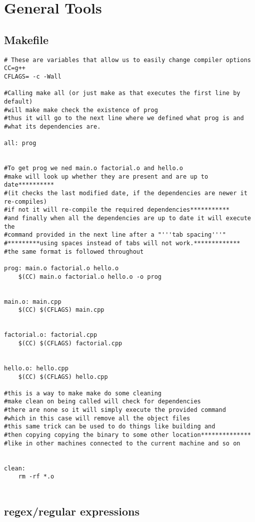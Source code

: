 \chapter{General Tools}
\section{Makefile}



\begin{lstlisting}
# These are variables that allow us to easily change compiler options
CC=g++
CFLAGS= -c -Wall

#Calling make all (or just make as that executes the first line by default) 
#will make make check the existence of prog  
#thus it will go to the next line where we defined what prog is and 
#what its dependencies are.

all: prog


#To get prog we ned main.o factorial.o and hello.o
#make will look up whether they are present and are up to date**********
#(it checks the last modified date, if the dependencies are newer it re-compiles)
#if not it will re-compile the required dependencies***********
#and finally when all the dependencies are up to date it will execute the 
#command provided in the next line after a "'''tab spacing'''"
#*********using spaces instead of tabs will not work.*************
#the same format is followed throughout

prog: main.o factorial.o hello.o
    $(CC) main.o factorial.o hello.o -o prog
    
    
main.o: main.cpp
    $(CC) $(CFLAGS) main.cpp
    
    
factorial.o: factorial.cpp
    $(CC) $(CFLAGS) factorial.cpp
    
    
hello.o: hello.cpp
    $(CC) $(CFLAGS) hello.cpp
    
#this is a way to make make do some cleaning
#make clean on being called will check for dependencies
#there are none so it will simply execute the provided command 
#which in this case will remove all the object files
#this same trick can be used to do things like building and 
#then copying copying the binary to some other location**************
#like in other machines connected to the current machine and so on


clean:
    rm -rf *.o 
    
\end{lstlisting}


\section{regex/regular expressions}

